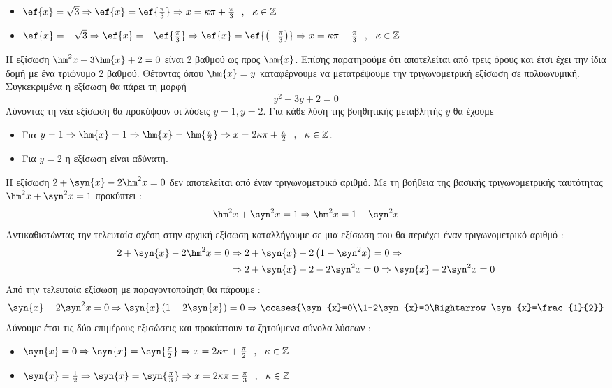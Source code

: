 \begin{rlist}
\begin{itemize}
\item $ \ef{x}=\sqrt{3}\Rightarrow\ef{x}=\ef{\frac{\pi}{3}}\Rightarrow x=\kappa\pi+\frac{\pi}{3}\ \ ,\ \ \kappa\in\mathbb{Z} $
\item $ \ef{x}=-\sqrt{3}\Rightarrow\ef{x}=-\ef{\frac{\pi}{3}}\Rightarrow\ef{x}=\ef{\left( -\frac{\pi}{3}\right) }\Rightarrow x=\kappa\pi-\frac{\pi}{3}\ \ ,\ \ \kappa\in\mathbb{Z} $
\end{itemize}
\item Η εξίσωση $ \hm^2{x}-3\hm{x}+2=0 $ είναι 2 βαθμού ως προς $ \hm{x} $. Επίσης παρατηρούμε ότι αποτελείται από τρεις όρους και έτσι έχει την ίδια δομή με ένα τριώνυμο 2 βαθμού. Θέτοντας όπου $ \hm{x}=y $ καταφέρνουμε να μετατρέψουμε την τριγωνομετρική εξίσωση σε πολυωνυμική. Συγκεκριμένα η εξίσωση θα πάρει τη μορφή
\[ y^2-3y+2=0 \]
Λύνοντας τη νέα εξίσωση θα προκύψουν οι λύσεις $ y=1,y=2 $. Για κάθε λύση της βοηθητικής μεταβλητής $ y $ θα έχουμε
\begin{itemize}
\item Για $ y=1\Rightarrow \hm{x}=1\Rightarrow\hm{x}=\hm{\frac{\pi}{2}}\Rightarrow x=2\kappa\pi+\frac{\pi}{2}\ \ ,\ \ \kappa\in\mathbb{Z} $.
\item Για $ y=2 $ η εξίσωση είναι αδύνατη.
\end{itemize}
\item Η εξίσωση $ 2+\syn{x}-2\hm^2{x}=0 $ δεν αποτελείται από έναν τριγωνομετρικό αριθμό. Με τη βοήθεια της βασικής τριγωνομετρικής ταυτότητας $ \hm^2{x}+\syn^2{x}=1 $ προκύπτει :
\[ \hm^2{x}+\syn^2{x}=1\Rightarrow \hm^2{x}=1-\syn^2{x} \]
Αντικαθιστώντας την τελευταία σχέση στην αρχική εξίσωση καταλλήγουμε σε μια εξίσωση που θα περιέχει έναν τριγωνομετρικό αριθμό :
\begin{align*}
 2+\syn{x}-2\hm^2{x}=0&\Rightarrow 2+\syn{x}-2\left( 1-\syn^2{x}\right) =0\Rightarrow\\&\Rightarrow 2+\syn{x}-2-2\syn^2{x}=0
\Rightarrow\syn{x}-2\syn^2{x}=0
\end{align*}
Από την τελευταία εξίσωση με παραγοντοποίηση θα πάρουμε :
\[ \syn{x}-2\syn^2{x}=0\Rightarrow\syn{x}\left( 1-2\syn{x}\right)=0\Rightarrow\ccases{\syn{x}=0\\1-2\syn{x}=0\Rightarrow\syn{x}=\frac{1}{2}} \]
Λύνουμε έτσι τις δύο επιμέρους εξισώσεις και προκύπτουν τα ζητούμενα σύνολα λύσεων :
\begin{itemize}
\item $ \syn{x}=0\Rightarrow \syn{x}=\syn{\frac{\pi}{2}}\Rightarrow x=2\kappa\pi+\frac{\pi}{2}\ \ ,\ \ \kappa\in\mathbb{Z} $
\item $ \syn{x}=\frac{1}{2}\Rightarrow\syn{x}=\syn{\frac{\pi}{3}}\Rightarrow x=2\kappa\pi\pm\frac{\pi}{3}\ \ ,\ \ \kappa\in\mathbb{Z} $
\end{itemize}
\end{rlist}
